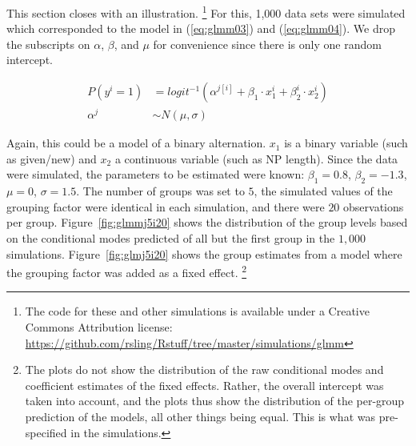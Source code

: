 \documentclass[a4paper,12pt]{article}
\begin{document}
This section closes with an illustration.%
\footnote{The code for these and other simulations is available under a Creative Commons Attribution license: \url{https://github.com/rsling/Rstuff/tree/master/simulations/glmm}}
For this, 1,000 data sets were simulated which corresponded to the model in (\ref{eq:glmm03}) and (\ref{eq:glmm04}).
We drop the subscripts on $\alpha$, $\beta$, and $\mu$ for convenience since there is only one random intercept.

\begin{align}
  P(y^i=1) & =logit^{-1}(\alpha^{j[i]}+\beta_1\cdot x_1^i+\beta_2^i\cdot x_2^i)
  \label{eq:glmm03}\\
  \alpha^j & \sim N(\mu, \sigma)\label{eq:glmm04}
\end{align}

Again, this could be a model of a binary alternation.
$x_1$ is a binary variable (such as given\slash new) and $x_2$ a continuous variable (such as NP length).
Since the data were simulated, the parameters to be estimated were known: $\beta_1=0.8$, $\beta_2=-1.3$, $\mu=0$, $\sigma=1.5$.
The number of groups was set to $5$, the simulated values of the grouping factor were identical in each simulation, and there were $20$ observations per group.
Figure~\ref{fig:glmmj5i20} shows the distribution of the group levels based on the conditional modes predicted of all but the first group in the $1,000$ simulations.
Figure~\ref{fig:glmj5i20} shows the group estimates from a model where the grouping factor was added as a fixed effect.%
\footnote{The plots do not show the distribution of the raw conditional modes and coefficient estimates of the fixed effects.
Rather, the overall intercept was taken into account, and the plots thus show the distribution of the per-group prediction of the models, all other things being equal.
This is what was pre-specified in the simulations.}
\end{document}
